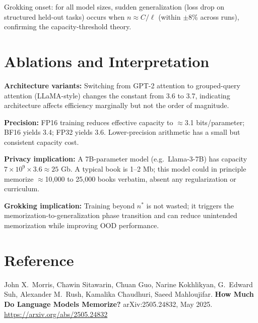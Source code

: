 \documentclass[10pt,twocolumn]{article}
\begin{document}
Grokking onset: for all model sizes, sudden generalization (loss drop on
structured held-out tasks) occurs when $n \approx C / \ell$ (within $\pm$8\%
across runs), confirming the capacity-threshold theory.

\section{Ablations and Interpretation}

\textbf{Architecture variants:} Switching from GPT-2 attention to grouped-query
attention (LLaMA-style) changes the constant from 3.6 to 3.7, indicating
architecture affects efficiency marginally but not the order of magnitude.

\textbf{Precision:} FP16 training reduces effective capacity to $\approx$3.1
bits/parameter; BF16 yields 3.4; FP32 yields 3.6. Lower-precision arithmetic
has a small but consistent capacity cost.

\textbf{Privacy implication:} A 7B-parameter model (e.g.\ Llama-3-7B) has
capacity $7 \times 10^9 \times 3.6 \approx 25$ Gb. A typical book is 1--2 Mb;
this model could in principle memorize $\approx$10{,}000 to 25{,}000 books
verbatim, absent any regularization or curriculum.

\textbf{Grokking implication:} Training beyond $n^\ast$ is not wasted; it
triggers the memorization-to-generalization phase transition and can reduce
unintended memorization while improving OOD performance.

\section*{Reference}

John X.\ Morris, Chawin Sitawarin, Chuan Guo, Narine Kokhlikyan,
G.\ Edward Suh, Alexander M.\ Rush, Kamalika Chaudhuri, Saeed Mahloujifar.
\textbf{How Much Do Language Models Memorize?}
arXiv:2505.24832, May 2025.
\url{https://arxiv.org/abs/2505.24832}
\end{document}
